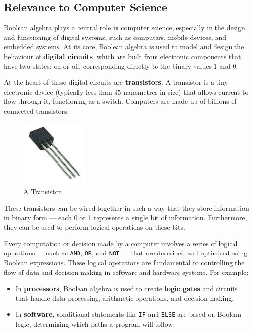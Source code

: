 \subsection*{Relevance to Computer Science}
Boolean algebra plays a central role in computer science, especially in the design and functioning of digital systems, such as computers, mobile devices, and embedded systems. At its core, Boolean algebra is used to model and design the behaviour of \textbf{digital circuits}, which are built from electronic components that have two states: on or off, corresponding directly to the binary values 1 and 0.

At the heart of these digital circuits are \textbf{transistors}. A transistor is a tiny electronic device (typically less than 45 nanometres in size) that allows current to flow through it, functioning as a switch. Computers are made up of billions of connected transistors.

\begin{figure}[htbp]
    \centering
    \includegraphics[width = 0.3\textwidth]{figure/transistor.png} %
    \caption{A Transistor.}
    \label{fig:transistor}
\end{figure}

These transistors can be wired together in such a way that they store information in binary form — each 0 or 1 represents a single bit of information. Furthermore, they can be used to perform logical operations on these bits.

Every computation or decision made by a computer involves a series of logical operations — such as \texttt{AND}, \texttt{OR}, and \texttt{NOT} — that are described and optimised using Boolean expressions. These logical operations are fundamental to controlling the flow of data and decision-making in software and hardware systems. For example:

\begin{itemize}
    \item In \textbf{processors}, Boolean algebra is used to create \textbf{logic gates} and circuits that handle data processing, arithmetic operations, and decision-making.
    \item In \textbf{software}, conditional statements like \texttt{IF} and \texttt{ELSE} are based on Boolean logic, determining which paths a program will follow.
\end{itemize}

